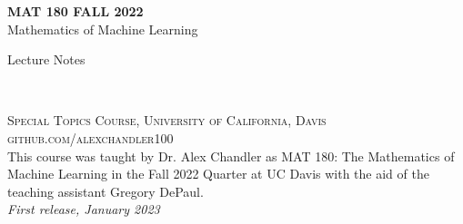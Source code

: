 
\begingroup
\thispagestyle{empty}
\centering
\vspace*{9cm}
\par\normalfont\fontsize{35}{35}\sffamily\selectfont
\textbf{MAT 180 FALL 2022}\\
{\LARGE Mathematics of Machine Learning}\par %
\vspace*{1cm}
{\Huge Lecture Notes}\par %
\endgroup


\newpage
~\vfill
\thispagestyle{empty}


\noindent \textsc{Special Topics Course, University of California, Davis}\\

\noindent \textsc{github.com/alexchandler100}\\ %

\noindent This course was taught by Dr. Alex Chandler as MAT 180: The Mathematics of Machine Learning in the Fall 2022 Quarter at UC Davis with the aid of the teaching assistant Gregory DePaul.\\ %

\noindent \textit{First release, January 2023} %



\pagestyle{empty} %

\tableofcontents %


